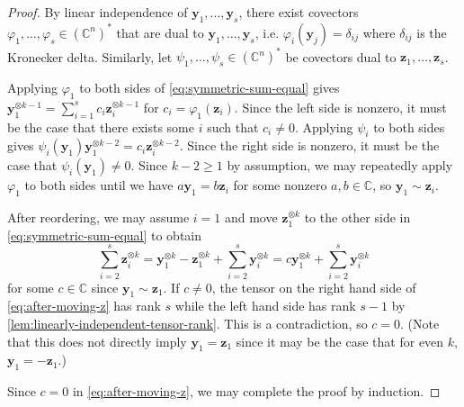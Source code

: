 \documentclass[11pt]{article}
\renewcommand{\phi}{\varphi}
\begin{document}
\begin{proof}
By linear independence of $\mathbf{y}_1, \ldots, \mathbf{y}_s$, there exist covectors $\phi_1, \ldots, \phi_s \in (\mathbb{C}^n)^*$ that are dual to $\mathbf{y}_1, \ldots, \mathbf{y}_s$, i.e. 
$\phi_i(\mathbf{y}_j) = \delta_{ij}$ where $\delta_{ij}$ is the Kronecker delta.
Similarly, let $\psi_1, \ldots, \psi_s \in (\mathbb{C}^n)^*$ be covectors dual to $\mathbf{z}_1, \ldots, \mathbf{z}_s$.

Applying $\phi_1$ to both sides of \cref{eq:symmetric-sum-equal} gives
$\mathbf{y}_1 ^{\otimes k - 1} = \sum_{i = 1}^{s} c_i \mathbf{z}_i^{\otimes k - 1}$ for $c_i = \phi_1(\mathbf{z}_i)$.
Since the left side is nonzero, it must be the case that there exists some $i$ such that $c_i \ne 0$.
Applying $\psi_i$ to both sides gives
$\psi_i(\mathbf{y}_1) \mathbf{y}_1^{\otimes k - 2} = c_i \mathbf{z}_i^{\otimes k - 2}$.
Since the right side is nonzero, it must be the case that $\psi_i(\mathbf{y}_1) \ne 0$.
Since $k - 2 \ge 1$ by assumption, we may repeatedly apply $\phi_1$ to both sides until we have $a \mathbf{y}_1 = b \mathbf{z}_i$ for some nonzero $a, b \in \mathbb{C}$, so $\mathbf{y}_1 \sim \mathbf{z}_i$.

After reordering, we may assume $i = 1$ and move $\mathbf{z}_1^{\otimes k}$ to the other side in \cref{eq:symmetric-sum-equal} to obtain
\begin{equation}\label{eq:after-moving-z}
\sum_{i = 2}^{s} \mathbf{z}_i^{\otimes k} = 
\mathbf{y}_1^{\otimes k} - \mathbf{z}_1^{\otimes k} + \sum_{i = 2}^s \mathbf{y}_i^{\otimes k} = c \mathbf{y}_1^{\otimes k} + \sum_{i = 2}^{s} \mathbf{y}_i^{\otimes k}
\end{equation}
for some $c \in \mathbb{C}$ since $\mathbf{y}_1 \sim \mathbf{z}_1$.
If $c \ne 0$, the tensor on the right hand side of \cref{eq:after-moving-z} has rank $s$ while the left hand side has rank $s - 1$ by \cref{lem:linearly-independent-tensor-rank}.
This is a contradiction, so $c = 0$.
(Note that this does not directly imply $\mathbf{y}_1 = \mathbf{z}_1$ since it may be the case that for even $k$, $\mathbf{y}_1 = - \mathbf{z}_1$.)

Since $c = 0$ in \cref{eq:after-moving-z}, we may complete the proof by induction.
\end{proof}
\end{document}
